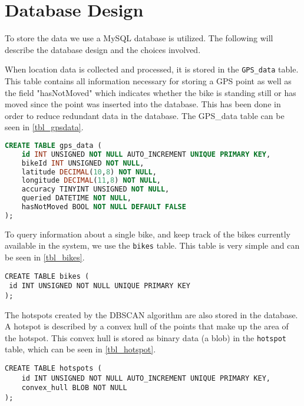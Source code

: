 \chapter{Database Design}\label{database_design}
To store the data we use a MySQL database is utilized.
The following will describe the database design and the choices involved.

When location data is collected and processed, it is stored in the \texttt{GPS\_data} table.
This table contains all information necessary for storing a GPS point as well as the field "hasNotMoved" which indicates whether the bike is standing still or has moved since the point was inserted into the database.
This has been done in order to reduce redundant data in the database.
The GPS\_data table can be seen in \cref{tbl_gpsdata}.

\begin{lstlisting}[caption=Table for GPS\_data, label=tbl_gpsdata, language=SQL]
CREATE TABLE gps_data (
	id INT UNSIGNED NOT NULL AUTO_INCREMENT UNIQUE PRIMARY KEY,
	bikeId INT UNSIGNED NOT NULL,
	latitude DECIMAL(10,8) NOT NULL,
	longitude DECIMAL(11,8) NOT NULL,
	accuracy TINYINT UNSIGNED NOT NULL,
	queried DATETIME NOT NULL,
	hasNotMoved BOOL NOT NULL DEFAULT FALSE
);
\end{lstlisting}

To query information about a single bike, and keep track of the bikes currently available in the system, we use the \texttt{bikes} table.
This table is very simple and can be seen in \cref{tbl_bikes}.

\begin{lstlisting}[caption=Table for bikes, label=tbl_bikes]
CREATE TABLE bikes (
 id INT UNSIGNED NOT NULL UNIQUE PRIMARY KEY
);
\end{lstlisting}

The hotspots created by the DBSCAN algorithm are also stored in the database.
A hotspot is described by a convex hull of the points that make up the area of the hotspot.
This convex hull is stored as binary data (a blob) in the \texttt{hotspot} table, which can be seen in \cref{tbl_hotspot}.

\begin{lstlisting}[caption=Table for hotspots, label=tbl_hotspot]
CREATE TABLE hotspots (
	id INT UNSIGNED NOT NULL AUTO_INCREMENT UNIQUE PRIMARY KEY,
	convex_hull BLOB NOT NULL
);
\end{lstlisting}